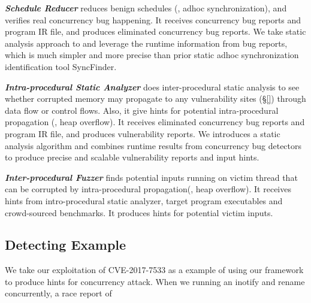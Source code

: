 \emph{\textbf{Schedule Reducer}} reduces benign schedules (\eg, adhoc synchronization), and verifies real concurrency bug happening.  
It receives concurrency bug reports and program IR file, and produces eliminated concurrency bug reports. 
We take static analysis approach to and leverage the runtime information from bug reports, 
which is much simpler and more precise than prior static adhoc synchronization identification tool SyncFinder\cite{syncfinder:osdi10}.

\emph{\textbf{Intra-procedural Static Analyzer}} does inter-procedural static analysis to 
see whether corrupted memory may propagate to 
any vulnerability sites (\S\ref{}) through data flow or control flows. 
Also, it give hints for potential intra-procedural propagation (\eg, heap overflow). 
It receives eliminated concurrency bug reports and program IR file, and produces vulnerability reports.  
We introduces a static analysis algorithm and combines runtime results from concurrency bug detectors to produce  
precise and scalable vulnerability reports and input hints. 

\emph{\textbf{Inter-procedural Fuzzer}} finds potential inputs running on victim thread 
that can be corrupted by intra-procedural propagation(\eg, heap overflow). It receives 
hints from intro-procedural static analyzer, target program executables and crowd-sourced 
benchmarks. It produces hints for potential victim inputs. 
     

\subsection{Detecting Example}\label{sec:example}

We take our exploitation of CVE-2017-7533 as a example of using our framework to produce hints for concurrency attack. 
When we running an inotify and rename concurrently, a race report of  
